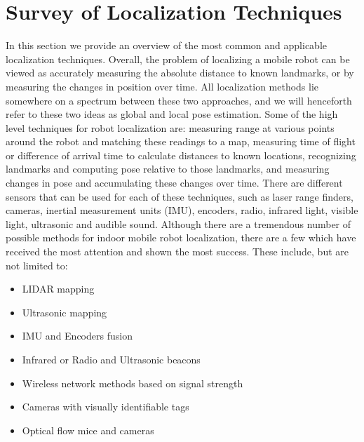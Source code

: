 \documentclass{article}
\newcommand{\Newnameref}[1]{\textit{\nameref{#1}}}
\begin{document}

\tableofcontents




\section{Survey of Localization Techniques} \label{section:related_work}

   In this section we provide an overview of the most common and applicable localization techniques. Overall, the problem of localizing a mobile robot can be viewed as accurately measuring the absolute distance to known landmarks, or by measuring the changes in position over time. All localization methods lie somewhere on a spectrum between these two approaches, and we will henceforth refer to these two ideas as global and local pose estimation. Some of the high level techniques for robot localization are: measuring range at various points around the robot and matching these readings to a map, measuring time of flight or difference of arrival time to calculate distances to known locations, recognizing landmarks and computing pose relative to those landmarks, and measuring changes in pose and accumulating these changes over time. There are different sensors that can be used for each of these techniques, such as laser range finders, cameras, inertial measurement units (IMU), encoders, radio, infrared light, visible light, ultrasonic and audible sound. Although there are a tremendous number of possible methods for indoor mobile robot localization, there are a few which have received the most attention and shown the most success. These include, but are not limited to:
  \begin{itemize}
    \item LIDAR mapping
    \item Ultrasonic mapping
    \item IMU and Encoders fusion
    \item Infrared or Radio and Ultrasonic beacons
    \item Wireless network methods based on signal strength
    \item Cameras with visually identifiable tags
    \item Optical flow mice and cameras
  \end{itemize}
\end{document}
